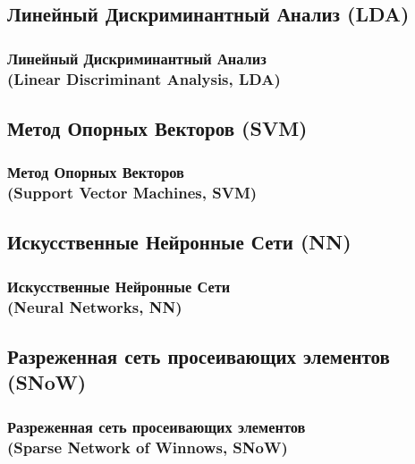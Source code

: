 \documentclass{beamer}
\begin{document}
\subsection{Линейный Дискриминантный Анализ (LDA)}

\begin{frame}
\frametitle{Линейный Дискриминантный Анализ\\(Linear Discriminant Analysis, LDA)}

\end{frame}

\subsection{Метод Опорных Векторов (SVM)}

\begin{frame}
\frametitle{Метод Опорных Векторов\\(Support Vector Machines, SVM)}

\end{frame}

\subsection{Искусственные Нейронные Сети (NN)}

\begin{frame}
\frametitle{Искусственные Нейронные Сети\\(Neural Networks, NN)}

\end{frame}

\subsection{Разреженная сеть просеивающих элементов (SNoW)}

\begin{frame}
\frametitle{Разреженная сеть просеивающих элементов\\(Sparse Network of Winnows, SNoW)}

\end{frame}
\end{document}
